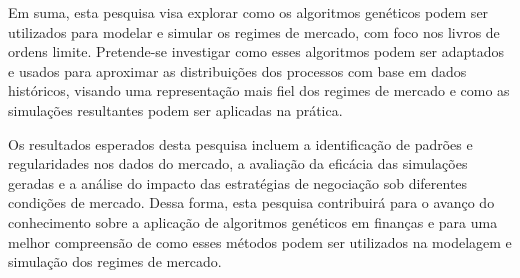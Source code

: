 Em suma, esta pesquisa visa explorar como os algoritmos genéticos podem ser utilizados para modelar e simular os regimes de mercado, com foco nos livros de ordens limite. Pretende-se investigar como esses algoritmos podem ser adaptados e usados para aproximar as distribuições dos processos com base em dados históricos, visando uma representação mais fiel dos regimes de mercado e como as simulações resultantes podem ser aplicadas na prática.

Os resultados esperados desta pesquisa incluem a identificação de padrões e regularidades nos dados do mercado, a avaliação da eficácia das simulações geradas e a análise do impacto das estratégias de negociação sob diferentes condições de mercado. Dessa forma, esta pesquisa contribuirá para o avanço do conhecimento sobre a aplicação de algoritmos genéticos em finanças e para uma melhor compreensão de como esses métodos podem ser utilizados na modelagem e simulação dos regimes de mercado.